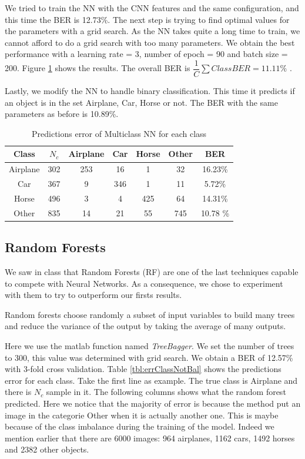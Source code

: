 \documentclass{article} %
\begin{document}
We tried to train the NN with the CNN features and the same configuration, and this time the BER is 12.73\%.
The next step is trying to find optimal values for the parameters with a grid search. As the NN takes quite a long time to train, we cannot afford to do a grid search with too many parameters.
We obtain the best performance with a learning rate = 3, number of epoch = 90 and batch size = 200. 
Figure \ref{tbl:errClassNN} shows the results. The overall BER is $\dfrac{1}{C}\sum Class BER= 11.11\%$ . 

Lastly, we modify the NN to handle binary classification. This time it predicts if an object is in the set {Airplane, Car, Horse} or not. The BER with the same parameters as before is 10.89\%.

\begin{table}
	\centering
	\begin{tabular}{|c|c|c|c|c|c|c|}
		\hline Class & $N_{c}$ & Airplane & Car & Horse & Other & BER \\ 
		\hline Airplane & 302 & 253 & 16 & 1 & 32 & 16.23\% \\ 
		\hline Car & 367 & 9 & 346 & 1 & 11 & 5.72\% \\ 
		\hline Horse & 496 & 3 & 4 & 425 & 64 & 14.31\% \\ 
		\hline Other & 835 & 14 & 21 & 55 & 745 & 10.78 \% \\ 
		\hline 
	\end{tabular} 
	\caption{Predictions error of Multiclass NN for each class}
	\label{tbl:errClassNN}
\end{table}

\subsection{Random Forests}
We saw in class that Random Forests (RF) are one of the last techniques capable to compete with Neural Networks.
As a consequence, we chose to experiment with them to try to outperform our firsts results.

Random forests choose randomly a subset of input variables to build many trees and reduce the variance of the output by taking the average of many outputs.

Here we use the matlab function named \emph{TreeBagger}. We set the number of trees to 300, this value was determined with grid search.
We obtain a BER of 12.57\% with 3-fold cross validation. Table \ref{tbl:errClassNotBal} shows the predictions error for each class. Take the first line as example. The true class is Airplane and there is $N_c$ sample in it. The following columns shows what the random forest predicted.
Here we notice that the majority of error is because the method put an image in the categorie Other when it is actually another one.
This is maybe because of the class imbalance during the training of the model. Indeed we mention earlier that there are 6000 images: 964 airplanes, 1162 cars, 1492 horses and 2382 other objects.
\end{document}
